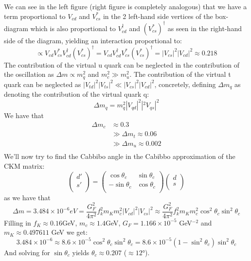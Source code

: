 \documentclass[10pt,a4paper,twoside]{article}
\begin{document}
We can see in the left figure (right figure is completely analogous) that we have a term proportional to $V_{cd}$ and $V_{cs}^*$ in the 2 left-hand side vertices of the box-diagram which is also proportional to $V_{cd}^\dagger$ and $(V_{cs}^*)^\dagger$ as seen in the right-hand side of the diagram, yielding an interaction proportional to:
\begin{equation}
	\propto V_{cd}V_{cs}^*V_{cd}^\dagger(V_{cs}^*)^\dagger = V_{cd}V_{cd}^\dagger V_{cs}^*(V_{cs}^*)^\dagger = |V_{cs}|^2|V_{cd}|^2 \approx 0.218
\end{equation}
The contribution of the virtual u quark can be neglected in the contribution of the oscillation as $\Delta m \propto m_q^2$ and $m_c^2 \gg m_u^2$. The contribution of the virtual t quark can be neglected as $|V_{td}|^2|V_{ts}|^2 \ll |V_{cs}|^2|V_{cd}|^2$, concretely, defining $\Delta m_q$ as denoting the contribution of the virtual quark q:
\begin{equation}
	\Delta m_q = m_q^2|V_{qd}|^2|^2V_{qs}|^2
\end{equation}
We have that
\begin{align}
	\Delta m_c &\approx  0.3\\
	&\gg  \Delta m_t \approx  0.06\\
	&\gg \Delta m_u \approx 0.002\\
\end{align}
We'll now try to find the Cabbibo angle in the Cabibbo approximation of the CKM matrix:
\begin{equation}
	\left( {\begin{array}{c}
		d'\\
		s'\\
		\end{array} } \right) = \left( {\begin{array}{cc}
		\cos\theta_c & \sin\theta_c\\
		-\sin\theta_c & \cos\theta_c \\
		\end{array} } \right) \left( {\begin{array}{c}
		d\\
		s\\
		\end{array} } \right)
\end{equation}
as we have that
\begin{equation}
	\Delta m = 3.484\times10^{-6} eV = \frac{G_F^2}{4\pi^2}f_k^2m_Km_c^2|V_{cd}|^2|V_{cs}|^2 \approx \frac{G_F^2}{4\pi^2}f_k^2m_Km_c^2\cos^2\theta_c\sin^2\theta_c
\end{equation}
Filling in $f_K\approx0.16$GeV, $m_c \approx 1.4$GeV, $G_F = 1.166\times10^{-5}$ GeV$^{-2}$ \cite{Group2020} and $m_K \approx 0.497611$ GeV we get:
\begin{equation}
	3.484\times10^{-6} \approx 8.6\times10^{-5} \cos^2\theta_c\sin^2\theta_c = 8.6\times10^{-5} (1-\sin^2\theta_c)\sin^2\theta_c 
\end{equation}
And solving for $\sin\theta_c$ yields $\theta_c \approx 0.207$ ($\approx 12$°).
\end{document}
